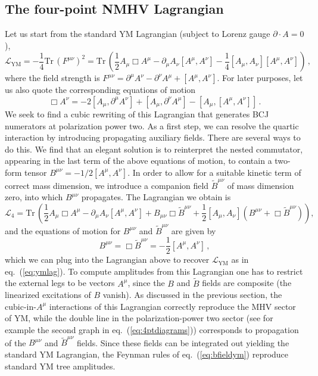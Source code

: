 \documentclass[11pt,a4paper]{article}
\def\eqn#1{eq.~(\ref{#1})}
\begin{document}
\subsection{The four-point NMHV Lagrangian}
Let us start from the standard YM Lagrangian (subject to Lorenz gauge $\partial \cdot A=0$),
\begin{equation} \label{eq:ymlag}
\mathcal{L}_{\text{YM}}=- \frac{1}{4} \text{Tr} \,  (F^{\mu \nu})^2 = \text{Tr} \, \left( \frac{1}{2} A_\mu \Box A^\mu -\partial_\mu A_\nu [A^\mu,A^\nu] - \frac{1}{4} [A_\mu,A_\nu][A^\mu,A^\nu] \right) \,  ,
\end{equation}
where the field strength is $F^{\mu \nu}= \partial^\mu A^\nu -\partial^\nu A^\mu + [A^\mu , A^\nu] $.
For later purposes, let us also quote the corresponding equations of motion 
\begin{equation}
    \Box A^\nu = -2 [A_\mu, \partial^\mu A^\nu]+[A_\mu, \partial^\nu A^\mu] - [A_\mu, [A^\mu, A^\nu]]\, .
\end{equation}
 We seek to find a cubic rewriting of this Lagrangian that generates BCJ numerators at polarization power two. As a first step, we can resolve the quartic interaction by introducing propagating auxiliary fields. There are several ways to do this.  We find that an elegant solution is to reinterpret the nested commutator, appearing in the last term of the above equations of motion, to contain a two-form tensor $B^{\mu \nu} = -1/2 [A^\mu, A^\nu]$. In order to allow for a suitable kinetic term of correct mass dimension, we introduce a companion field $\tilde{B}^{\mu \nu}$ of mass dimension zero, into which $B^{\mu \nu}$ propagates. The Lagrangian we obtain is
\begin{equation}
\label{eq:bfieldym}
    \mathcal{L}_4 = \text{Tr} \, \left( \frac{1}{2} A_\mu \Box A^\mu -\partial_\mu A_\nu [A^\mu,A^\nu] + B_{\mu \nu} \Box \tilde{B}^{\mu \nu} + \frac{1}{2}  [A_\mu , A_\nu] (B^{\mu \nu} + \Box \tilde{B}^{\mu \nu}) \right),
\end{equation}
and the equations of motion for $B^{\mu \nu}$ and $\tilde{B}^{\mu \nu}$ are given by
\begin{equation}
    B^{\mu \nu} = \Box \tilde{B}^{\mu \nu} =-\frac{1}{2} [A^\mu,A^\nu]\, ,
\end{equation}
which we can plug into the Lagrangian above to recover $\mathcal{L}_{\text{YM}}$ as in \eqn{eq:ymlag}.
To compute amplitudes from this Lagrangian one has to restrict the external legs to be vectors $A^\mu$, since the $B$ and $\tilde{B}$ fields are composite (the linearized excitations of $B$ vanish). As discussed in the previous section, the cubic-in-$A^\mu$ interactions of this Lagrangian correctly reproduce the MHV sector of YM, while the double line in the polarization-power two sector (see for example the second graph in \eqn{eq:4ptdiagrams}) corresponds to propagation of the $B^{\mu \nu}$ and $\tilde{B}^{\mu \nu}$ fields. Since these fields can be integrated out yielding the standard YM Lagrangian, the Feynman rules of \eqn{eq:bfieldym} reproduce standard YM tree amplitudes. 
\end{document}
